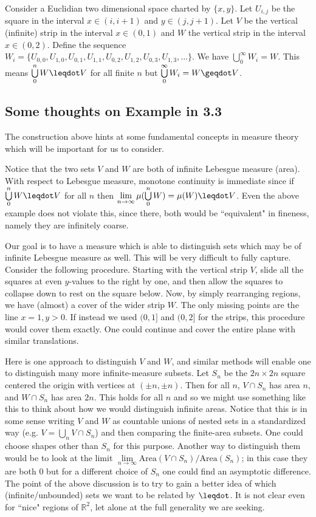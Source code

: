 \documentclass[11pt]{article}
\begin{document}
Consider a Euclidian two dimensional space charted by $\{x,y\}$. Let $U_{i,j}$ be the square in the interval $x \in (i, i+1)$ and $y \in (j, j+1)$. Let $V$ be the vertical (infinite) strip in the interval $x \in (0, 1)$ and $W$ the vertical strip in the interval $x \in (0, 2)$. Define the sequence $W_i = \{ U_{0,0}, U_{1,0}, U_{0,1}, U_{1,1}, U_{0,2}, U_{1,2}, U_{0,3}, U_{1,3}, ... \}$. We have $\bigcup\limits_0^\infty W_i = W$. This means $\bigcup\limits_0^n W\finer V$ for all finite $n$ but $\bigcup\limits_0^\infty W_i = W \coarser V$. 

\subsection{Some thoughts on Example in 3.3}

The construction above hints at some fundamental concepts in measure theory which will be important for us to consider. 

Notice that the two sets $V$ and $W$ are both of infinite Lebesgue measure (area). With respect to Lebesgue measure, monotone continuity is immediate since if $\bigcup\limits_0^n W\finer V$ for all $n$ then $\lim\limits_{n\to\infty}\mu(\bigcup\limits_0^n W) = \mu(W)\finer V$. Even the above example does not violate this, since there, both would be ``equivalent" in fineness, namely they are infinitely coarse.

Our goal is to have a measure which is able to distinguish sets which may be of infinite Lebesgue measure as well. This will be very difficult to fully capture. Consider the following procedure. Starting with the vertical strip $V$, slide all the squares at even $y$-values to the right by one, and then allow the squares to collapse down to rest on the square below. Now, by simply rearranging regions, we have (almost) a cover of the wider strip $W$. The only missing points are the line $x=1, y>0$. If instead we used $(0,1]$ and $(0,2]$ for the strips, this procedure would cover them exactly. One could continue and cover the entire plane with similar translations. 

Here is one approach to distinguish $V$ and $W$, and similar methods will enable one to distinguish many more infinite-measure subsets. Let $S_n$ be the $2n\times 2n$ square centered the origin with vertices at $(\pm n, \pm n)$. Then for all $n$, $V\cap S_n$ has area $n$, and $W\cap S_n$ has area $2n$. This holds for all $n$ and so we might use something like this to think about how we would distinguish infinite areas. Notice that this is in some sense writing $V$ and $W$ as countable unions of nested sets in a standardized way (e.g. $V = \bigcup\limits_n V\cap S_n$) and then comparing the finite-area subsets. One could choose shapes other than $S_n$ for this purpose. Another way to distinguish them would be to look at the limit $\lim\limits_{n\to\infty}\text{Area}(V\cap S_n)/\text{Area}(S_n)$; in this case they are both 0 but for a different choice of $S_n$ one could find an asymptotic difference. 
The point of the above discussion is to try to gain a better idea of which (infinite/unbounded) sets we want to be related by $\finer$. It is not clear even for ``nice" regions of $\mathbb{R}^2$, let alone at the full generality we are seeking. 
\end{document}
